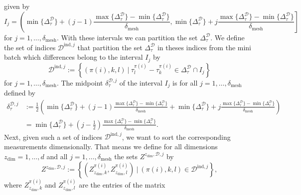 \documentclass[11pt,titlepage]{article}
\theoremstyle{definition}
\theoremstyle{remark}
\begin{document}
	given by
	\[I_j = \left(\min\{\Delta^\mathcal{D}_\tau\} + (j-1)\frac{\max\{\Delta^\mathcal{D}_\tau\}- \min\{\Delta^\mathcal{D}_\tau\}}{\delta_\mathrm{mesh}}, \min\{\Delta^\mathcal{D}_\tau\} + j\frac{\max\{\Delta^\mathcal{D}_\tau\}- \min\{\Delta^\mathcal{D}_\tau\}}{\delta_\mathrm{mesh}}\right]\]
	for $j=1,\ldots,\delta_\mathrm{mesh}$. With these intervals we can partition the set $\Delta_\tau^\mathcal{D}$. 
	We define the set of indices $\mathcal{D}^{\mathrm{ind},j}$ that partition the set $\Delta_\tau^\mathcal{D}$ in theses indices from the mini batch which differences belong to the interval $I_j$ by
	\[\mathcal{D}^{\mathrm{ind},j}:=\left\{(\pi(i),k,l)\ \vert\ \tau^{\pi(i)}_l - \tau^{\pi(i)}_k\in\Delta^\mathcal{D}_\tau\cap I_j\right\}\]
	for $j=1,\ldots,\delta_\mathrm{mesh}$. 
	The midpoint $\delta_\tau^{\mathcal{D},j}$ of the interval $I_j$ is for all $j=1,\ldots,\delta_\mathrm{mesh}$ defined by
	\begin{align*}
		\delta_\tau^{\mathcal{D},j} &:= \frac{1}{2}\left(\min\{\Delta^\mathcal{D}_\tau\} + (j-1)\frac{\max\{\Delta^\mathcal{D}_\tau\}- \min\{\Delta^\mathcal{D}_\tau\}}{\delta_\mathrm{mesh}} + \min\{\Delta^\mathcal{D}_\tau\} + j\frac{\max\{\Delta^\mathcal{D}_\tau\}- \min\{\Delta^\mathcal{D}_\tau\}}{\delta_\mathrm{mesh}}\right)\\
		&= \min\{\Delta^\mathcal{D}_\tau\} + \left(j-\frac{1}{2}\right)\frac{\max\{\Delta^\mathcal{D}_\tau\}- \min\{\Delta^\mathcal{D}_\tau\}}{\delta_\mathrm{mesh}}.
	\end{align*}
	Next, given such a set of indices $\mathcal{D}^{\mathrm{ind},j}$, we want to sort the corresponding measurements dimensionally. That means we define for all dimensions $z_\mathrm{dim} = 1,\ldots, d$ and all $j=1,\ldots, \delta_\mathrm{mesh}$ the sets $Z^{z_\mathrm{dim},\mathcal{D},j}$ by
	\[Z^{z_\mathrm{dim},\mathcal{D},j}:=\left\{\left(Z_{z_\mathrm{dim},k}^{\pi(i)}, Z_{z_\mathrm{dim},l}^{\pi(i)}\right)\ \vert\ (\pi(i),k,l)\in \mathcal{D}^{\mathrm{ind},j}\right\},\]
	where $Z_{z_\mathrm{dim},k}^{\pi(i)}$ and $Z_{z_\mathrm{dim},l}^{\pi(i)}$ are the entries of the matrix 
\end{document}
